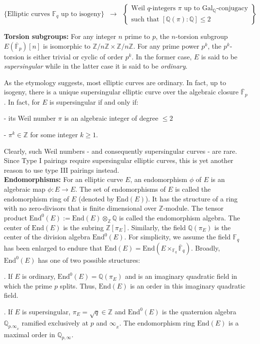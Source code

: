 \documentclass[11pt, lettersize, notitlepage, leqno, footskip=0.6cm]{article}
\newcommand{\bz}{\mathbb Z}
\newcommand{\bq}{\mathbb Q}
\newcommand{\bFP}{\ov{\mathbb{F}}_p}
\newcommand{\bFq}{\mathbb{F}_q}
\newcommand{\bFQ}{\ov{\mathbb{F}}_q}
\newcommand{\absq}{\mathrm{Gal}_{\bq}}
\newcommand{\lra}{\longrightarrow}
\newcommand{\mr}{\mathrm}
\newcommand{\ov}{\overline}
\newcommand{\noin}{\noindent}
\newcommand{\End}{\mr{End}}
\numberwithin{equation}{section}
\begin{document}
\[
  \{ \text{Elliptic curves } \bFq \text{ up to isogeny}  \} \;\;\lra\;\; \left\{\begin{array}{l}
    \text{Weil } q\text{-integers } \pi \text{ up to } \absq\text{-conjugacy}\\ 
    \text{such that } [\bq(\pi):\bq]\leq 2
  \end{array}\right\}
\]

\noin \textbf{Torsion subgroups:} For any integer $n$ prime to $p$, the $n$-torsion subgroup $E(\bFP)[n]$ is isomorphic to $\bz/n\bz\times \bz/n\bz$. For any prime power $p^k$, the $p^k$-torsion is either trivial or cyclic of order $p^k$. In the former case, $E$ is said to be \textit{supersingular} while in the latter case it is said to be \textit{ordinary}. 

As the etymology suggests, most elliptic curves are ordinary. In fact, up to isogeny, there is a unique supersingular elliptic curve over the algebraic closure $\bFP$. In fact, for $E$ is supersingular if and only if:

\noin - its Weil number $\pi$ is an algebraic integer of degree $\leq 2$  

\noin - $\pi^k\in \bz$ for some integer $k\geq 1$. 

Clearly, such Weil numbers - and consequently supersingular curves - are rare. Since Type I pairings require supersingular elliptic curves, this is yet another reason to use type III pairings instead. \\
  

\noin \textbf{Endomorphisms:} For an elliptic curve $E$, an endomorphism $\phi$ of $E$ is an algebraic map $\phi:E\lra E$. The set of endomorphisms of $E$ is called the endomorphism ring of $E$ (denoted by $\End(E)$). It has the structure of a ring with no zero-divisors that is finite dimensional over $\bz$-module. The tensor product $\End^0(E):= \End(E)\otimes_{\bz}\bq$ is called the endomorphism algebra. The center of $\End(E)$ is the subring $\bz[\pi_E]$. Similarly, the field $\bq(\pi_E)$ is the center of the division algebra $\End^0(E)$. For simplicity, we assume the field $\bFq$ has been enlarged to endure that $\End(E) = \End(E\times_{\bFq} \bFQ)$. Broadly, $\End^0(E)$ has one of two possible structures:

\noin 1. If $E$ is ordinary, $\End^0(E) = \bq(\pi_E)$ and is an imaginary quadratic field in which the prime $p$ splits. Thus, $\End(E)$ is an order in this imaginary quadratic field.

\noin 2. If $E$ is supersingular, $\pi_E = \sqrt{q} \in \bz$ and $\End^0(E)$ is the quaternion algebra $\bq_{p.\infty_{_E}}$ ramified exclusively at $p$ and $\infty_{_E}$. The endomorphism ring $\End(E)$ is a maximal order in $\bq_{p,\infty}$.\\
\end{document}
